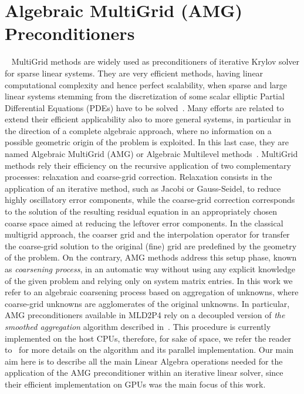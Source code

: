 \section{Algebraic MultiGrid (AMG) Preconditioners}~\label{AMG}
%
MultiGrid methods are widely used as preconditioners of iterative Krylov solver for sparse linear systems.
They are very efficient methods, having linear computational complexity and hence perfect scalability, when
sparse and large linear systems stemming
from the discretization of some scalar elliptic Partial Differential Equations (PDEs) have to be solved~\cite{Vassilevki2008}.
Many efforts are related to extend their efficient applicability also to more general systems, in particular in the direction of a complete algebraic approach, where no information on a possible geometric origin of the problem is exploited. In this last case, they are named Algebraic MultiGrid (AMG) or Algebraic Multilevel methods~\cite{Stuben2001}.
MultiGrid methods rely their efficiency on the recursive application of two complementary processes: {relaxation and coarse-grid correction}.
Relaxation consists in the application of an iterative method, such as Jacobi or Gauss-Seidel, to reduce highly oscillatory error components, while the coarse-grid correction corresponds to the solution of the resulting residual equation in an appropriately chosen coarse space aimed at reducing the leftover error components. In the classical multigrid approach, the coarser grid and the interpolation operator for transfer the coarse-grid solution to the original (fine) grid are predefined by the geometry of the problem. On the contrary, AMG methods address this setup phase, known as \emph{coarsening process}, in an automatic way without using any explicit knowledge of the given problem and relying only on system matrix entries. In this work we refer to an algebraic coarsening process based on aggregation of unknowns, where coarse-grid unknowns are agglomerates of the original unknowns. In particular, AMG preconditioners available in MLD2P4 rely on a decoupled version of \emph{the smoothed aggregation} algorithm described in~\cite{BrezinaVanek96,BrezinaVanek99}. This procedure is currently implemented on the host CPUs, therefore, for sake of space, we refer the reader to~\cite{mld2p4-2-guide} for more details on the algorithm and its parallel implementation.
Our main aim here is to describe all the main Linear Algebra operations needed for the application of the AMG preconditioner within an iterative
linear solver, since their efficient implementation on GPUs was the main focus of this work.
